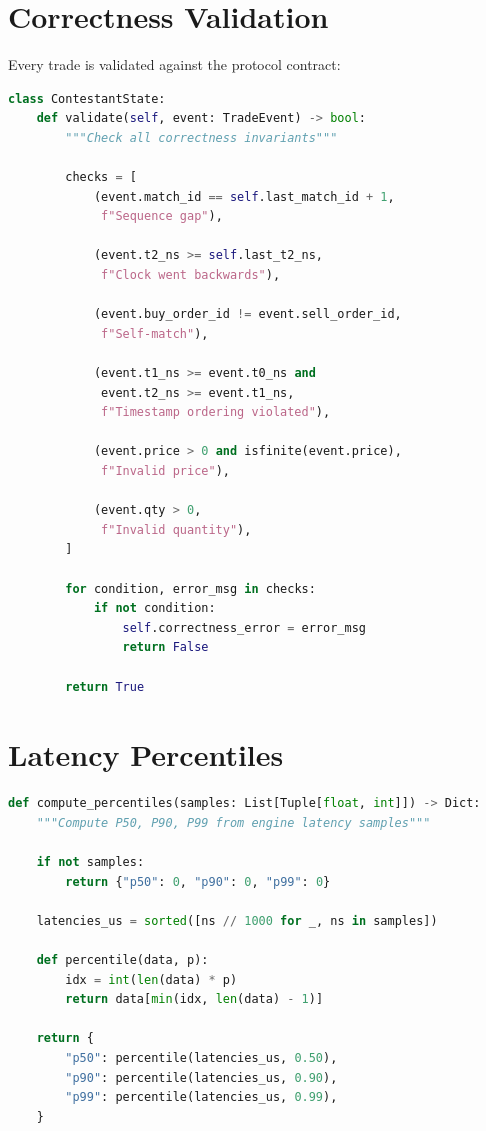 \documentclass[10pt,a4paper,oneside]{report}
\begin{document}
\section{Correctness Validation}

Every trade is validated against the protocol contract:

\begin{lstlisting}[language=python]
class ContestantState:
    def validate(self, event: TradeEvent) -> bool:
        """Check all correctness invariants"""

        checks = [
            (event.match_id == self.last_match_id + 1,
             f"Sequence gap"),

            (event.t2_ns >= self.last_t2_ns,
             f"Clock went backwards"),

            (event.buy_order_id != event.sell_order_id,
             f"Self-match"),

            (event.t1_ns >= event.t0_ns and
             event.t2_ns >= event.t1_ns,
             f"Timestamp ordering violated"),

            (event.price > 0 and isfinite(event.price),
             f"Invalid price"),

            (event.qty > 0,
             f"Invalid quantity"),
        ]

        for condition, error_msg in checks:
            if not condition:
                self.correctness_error = error_msg
                return False

        return True
\end{lstlisting}

\section{Latency Percentiles}

\begin{lstlisting}[language=python]
def compute_percentiles(samples: List[Tuple[float, int]]) -> Dict:
    """Compute P50, P90, P99 from engine latency samples"""

    if not samples:
        return {"p50": 0, "p90": 0, "p99": 0}

    latencies_us = sorted([ns // 1000 for _, ns in samples])

    def percentile(data, p):
        idx = int(len(data) * p)
        return data[min(idx, len(data) - 1)]

    return {
        "p50": percentile(latencies_us, 0.50),
        "p90": percentile(latencies_us, 0.90),
        "p99": percentile(latencies_us, 0.99),
    }
\end{lstlisting}
\end{document}
